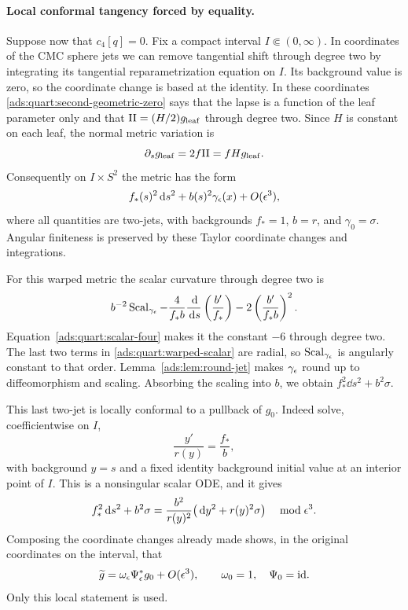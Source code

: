 \paragraph{Local conformal tangency forced by equality.}
Suppose now that \(c_4[q]=0\). Fix a compact interval
\(I\Subset(0,\infty)\).  In coordinates of the CMC sphere jets we can
remove tangential shift through degree two by integrating its
tangential reparametrization equation on \(I\).  Its background
value is zero, so the coordinate change is based at the identity.
In these coordinates \eqref{ads:quart:second-geometric-zero} says that the
lapse is a function of the leaf parameter only and that
\(\mathrm{II}=(H/2)g_{\rm leaf}\) through degree two.  Since \(H\) is
constant on each leaf, the normal metric variation is
\[
 \partial_s g_{\rm leaf}=2f\mathrm{II}=fH g_{\rm leaf}.
\]
Consequently on \(I\times S^2\) the metric has the form
\begin{equation}
 f_*(s)^2\,\mathrm d s^2+b(s)^2\gamma_\epsilon(x)+O(\epsilon^3),
 \label{ads:quart:warped-two}
\end{equation}
where all quantities are two-jets, with backgrounds \(f_*=1\),
\(b=r\), and \(\gamma_0=\sigma\).  Angular finiteness is preserved
by these Taylor coordinate changes and integrations.

For this warped metric the scalar curvature through degree two is
\begin{equation}
 b^{-2}\operatorname{Scal}_{\gamma_\epsilon}
   -\frac4{f_*b}\frac{\,\mathrm d}{\,\mathrm d s}
                      \left(\frac{b'}{f_*}\right)
   -2\left(\frac{b'}{f_*b}\right)^2.
 \label{ads:quart:warped-scalar}
\end{equation}
Equation~\eqref{ads:quart:scalar-four} makes it the constant \(-6\)
through degree two.  The last two terms in
\eqref{ads:quart:warped-scalar} are radial, so
\(\operatorname{Scal}_{\gamma_\epsilon}\) is angularly constant to that order.
Lemma~\ref{ads:lem:round-jet} makes \(\gamma_\epsilon\) round up to
diffeomorphism and scaling.  Absorbing the scaling into \(b\), we
obtain \(f_*^2\dd s^2+b^2\sigma\).

This last two-jet is locally conformal to a pullback of \(g_0\).
Indeed solve, coefficientwise on \(I\),
\begin{equation}
 \frac{y'}{r(y)}=\frac{f_*}{b},
 \label{ads:quart:radial-coordinate}
\end{equation}
with background \(y=s\) and a fixed identity background initial value
at an interior point of \(I\).  This is a nonsingular scalar ODE,
and it gives
\[
 f_*^2\,\mathrm d s^2+b^2\sigma
   =\frac{b^2}{r(y)^2}
       \bigl(\,\mathrm d y^2+r(y)^2\sigma\bigr)
       \quad\bmod\epsilon^3.
\]
Composing the coordinate changes already made shows, in the original
coordinates on the interval, that
\begin{equation}
 \widetilde g=\omega_\epsilon\Psi_\epsilon^*g_0+O(\epsilon^3),
 \qquad \omega_0=1,\quad\Psi_0=\mathrm{id}.
 \label{ads:quart:conformal-pullback}
\end{equation}
Only this local statement is used.

